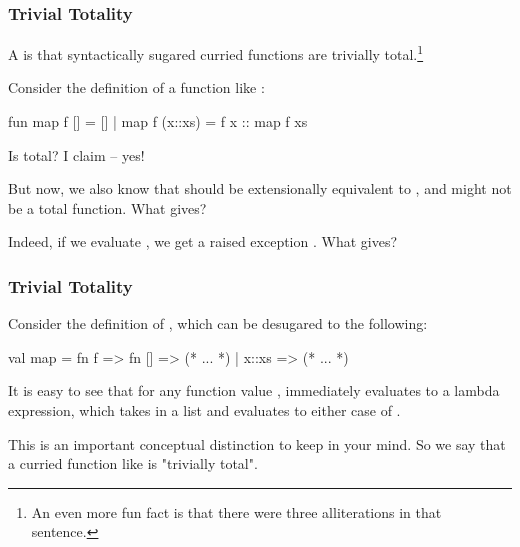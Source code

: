 \documentclass[aspectratio=169]{beamer}
\begin{document}
\begin{frame}[fragile]
  \frametitle{Trivial Totality}

  A  is that syntactically sugared curried functions are trivially total.\footnote{
    An even more fun fact is that there were three alliterations in that sentence.
  }

  \pause
  \vspace{\fill}

  Consider the definition of a function like :

  \pause
  \vspace{5pt}

  \begin{codeblock}
    fun map f [] = []
      | map f (x::xs) = f x :: map f xs
  \end{codeblock}

  \pause
  \vspace{\fill}

  Is  total? I claim -- yes!

  \pause
  \vspace{\fill}

  But now, we also know that  should be extensionally
  equivalent to \code{[f 1, f 2, f 3]}, and  might not be a total function.
  What gives?

  \pause
  \vspace{\fill}

  Indeed, if we evaluate , we get a
  raised exception . What gives?
\end{frame}

\begin{frame}[fragile]
  \frametitle{Trivial Totality}


  \pause
  \vspace{\fill}

  Consider the definition of , which can be desugared to the following:
  \begin{codeblock}
    val map = fn f => fn [] => (* ... *) | x::xs => (* ... *)
  \end{codeblock}

  \pause
  \vspace{\fill}

  It is easy to see that for any function value ,  immediately
  evaluates to a lambda expression, which takes in a list and evaluates to either
  case of .

  \pause
  \vspace{\fill}

  This is an important conceptual distinction to keep in your mind. So we say that
  a curried function like  is "trivially total".
\end{frame}
\end{document}
